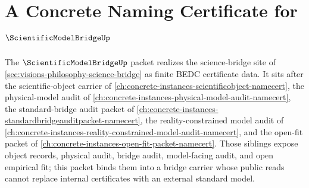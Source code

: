 \chapter{A Concrete Naming Certificate for $\ScientificModelBridgeUp$}
\label{ch:concrete-instances-scientificmodelbridge-namecert}

The $\ScientificModelBridgeUp$ packet realizes the science-bridge site of \autoref{sec:visions-philosophy-science-bridge} as finite BEDC certificate data. It sits after the scientific-object carrier of \autoref{ch:concrete-instances-scientificobject-namecert}, the physical-model audit of \autoref{ch:concrete-instances-physical-model-audit-namecert}, the standard-bridge audit packet of \autoref{ch:concrete-instances-standardbridgeauditpacket-namecert}, the reality-constrained model audit of \autoref{ch:concrete-instances-reality-constrained-model-audit-namecert}, and the open-fit packet of \autoref{ch:concrete-instances-open-fit-packet-namecert}. Those siblings expose object records, physical audit, bridge audit, model-facing audit, and open empirical fit; this packet binds them into a bridge carrier whose public reads cannot replace internal certificates with an external standard model.

